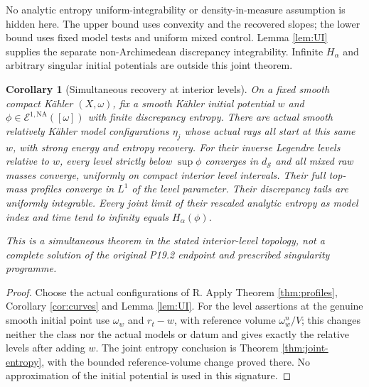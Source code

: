 \documentclass[11pt]{article}
\newcommand{\NA}{\mathrm{NA}}
\newcommand{\cE}{\mathcal E}
\newtheorem{corollary}[theorem]{Corollary}
\theoremstyle{remark}\newtheorem{remark}[theorem]{Remark}
\begin{document}
No analytic entropy uniform-integrability or density-in-measure
assumption is hidden here. The upper bound uses convexity and the
recovered slopes; the lower bound uses fixed model tests and uniform
mixed control. Lemma \ref{lem:UI} supplies the separate
non-Archimedean discrepancy integrability. Infinite $H_\alpha$ and
arbitrary singular initial potentials are outside this joint theorem.

\begin{corollary}[Simultaneous recovery at interior levels]\label{cor:combined}
On a fixed smooth compact K\"ahler $(X,\omega)$, fix a smooth
K\"ahler initial potential $w$ and
$\phi\in\cE^{1,\NA}([\omega])$ with finite discrepancy entropy.
There are actual smooth relatively K\"ahler model configurations
$\eta_j$ whose actual rays all start at this same $w$, with strong
energy and entropy recovery. For their inverse Legendre levels
relative to $w$, every level strictly below $\sup\phi$ converges
in $d_{\mathcal S}$ and all mixed raw masses converge, uniformly
on compact interior level intervals. Their full top-mass profiles
converge in $L^1$ of the level parameter. Their discrepancy tails
are uniformly integrable. Every joint limit of their rescaled
analytic entropy as model index and time tend to infinity equals
$H_\alpha(\phi)$.

This is a simultaneous theorem in the stated interior-level topology,
not a complete solution of the original P19.2 endpoint and prescribed
singularity programme.
\end{corollary}
\begin{proof}
Choose the actual configurations of R. Apply Theorem
\ref{thm:profiles}, Corollary \ref{cor:curves} and Lemma
\ref{lem:UI}. For the level assertions at the genuine smooth initial
point use $\omega_w$ and $r_t-w$, with reference volume
$\omega_w^n/V$; this changes neither the class nor the actual models
or datum and gives exactly the relative levels after adding $w$.
The joint entropy conclusion is Theorem \ref{thm:joint-entropy},
with the bounded reference-volume change proved there.
No approximation of the initial potential is used in this signature.
\end{proof}
\end{document}
